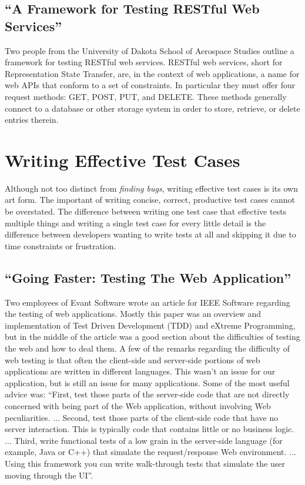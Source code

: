 \documentclass[12pt]{ucthesis}
\begin{document}
\subsection{``A Framework for Testing RESTful Web Services''}
Two people from the University of Dakota School of Aerospace Studies outline a framework for testing RESTful web services\cite{RESTfulFramework}. RESTful web services, short for Representation State Transfer, are, in the context of web applications, a name for web APIs that conform to a set of constraints. In particular they must offer four request methods: GET, POST, PUT, and DELETE. These methods generally connect to a database or other storage system in order to store, retrieve, or delete entries therein.

\section{Writing Effective Test Cases}
Although not too distinct from \emph{finding bugs}, writing effective test cases is its own art form. The important of writing concise, correct, productive test cases cannot be overstated. The difference between writing one test case that effective tests multiple things and writing a single test case for every little detail is the difference between developers wanting to write tests at all and skipping it due to time constraints or frustration.

\subsection{``Going Faster: Testing The Web Application''}
Two employees of Evant Software wrote an article for IEEE Software regarding the testing of web applications\cite{GoingFaster}. Mostly this paper was an overview and implementation of Test Driven Development (TDD) and eXtreme Programming, but in the middle of the article was a good section about the difficulties of testing the web and how to deal them. A few of the remarks regarding the difficulty of web testing is that often the client-side and server-side portions of web applications are written in different languages. This wasn't an issue for our application, but is still an issue for many applications. Some of the most useful advice was: ``First, test those parts of the server-side code that are not directly concerned with being part of the Web application, without involving Web peculiarities. ... Second, test those parts of the client-side code that have no server interaction. This is typically code that contains little or no business logic. ... Third, write functional tests of a low grain in the server-side language (for example, Java or C++) that simulate the request/response Web environment. ... Using this framework you can write walk-through tests that simulate the user moving through the UI''.
\end{document}
